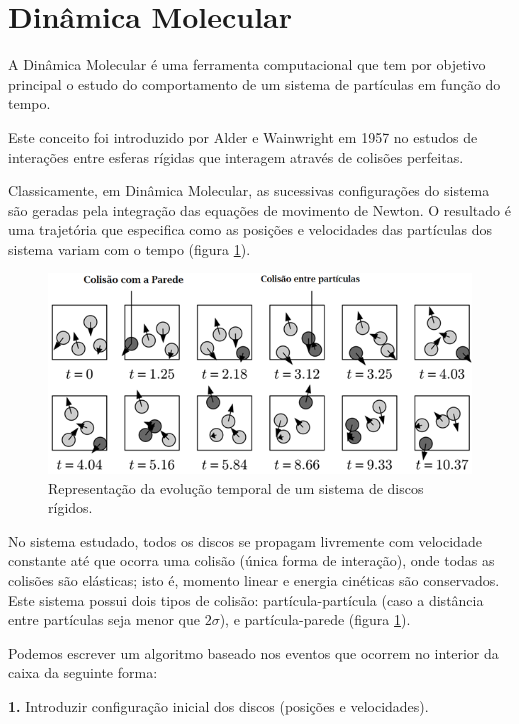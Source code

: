 \documentclass[%
reprint,
amsmath,amssymb,
aps,
12pt
]{revtex4-1}
\begin{document}
 	

 
	

\section{Dinâmica Molecular}
A Dinâmica Molecular é uma ferramenta computacional que tem por objetivo principal o estudo do comportamento de um sistema de partículas em função do tempo.

Este conceito foi introduzido por Alder e Wainwright em 1957 no estudos de interações entre esferas rígidas que interagem através de colisões perfeitas\cite{alder}.

Classicamente, em Dinâmica Molecular, as sucessivas configurações do sistema são geradas pela integração das equações de movimento de Newton. O resultado é uma trajetória que especifica como as posições e velocidades das partículas dos sistema variam com o tempo (figura \ref{dm1}).

\begin{figure}[!h]
	\centering
	\includegraphics[scale=0.52]{dm1.png}
	\caption{Representação da evolução temporal de um sistema de discos rígidos.
		\label{dm1}}
\end{figure}

No sistema estudado, todos os discos se propagam livremente com velocidade constante até que ocorra uma colisão (única forma de interação), onde todas as colisões são elásticas; isto é, momento linear e energia cinéticas são conservados. Este sistema possui dois tipos de colisão: partícula-partícula (caso a distância entre partículas seja menor que $ 2\sigma $), e partícula-parede (figura \ref{dm1}). 

Podemos escrever um algoritmo baseado nos eventos que ocorrem no interior da caixa da seguinte forma:

\textbf{1.} Introduzir configuração inicial dos discos (posições e velocidades).
\end{document}
